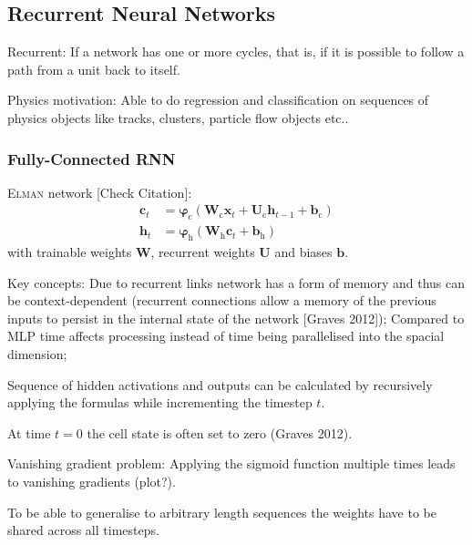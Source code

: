 \subsection{Recurrent Neural Networks}
\label{sec:rnn}

Recurrent: If a network has one or more cycles, that is, if it is possible to
follow a path from a unit back to itself.

Physics motivation: Able to do regression and classification on sequences of
physics objects like tracks, clusters, particle flow objects etc..

\subsubsection{Fully-Connected RNN}
\label{sec:fully_connected_rnn}


\textsc{Elman} network [Check Citation]\cite{elman, graves}:
\begin{align*}
  \mathbf{c}_t &= \bm{\varphi}_{\text{c}}\left( \mathbf{W}_{\text{c}} \mathbf{x}_{t} + \mathbf{U}_{\text{c}} \mathbf{h}_{t-1} + \mathbf{b}_{\text{c}} \right) \\
  \mathbf{h}_t &= \bm{\varphi}_{\text{h}}\left( \mathbf{W}_{\text{h}} \mathbf{c}_{t} + \mathbf{b}_{\text{h}} \right)
\end{align*}
 with
trainable weights $\mathbf{W}$, recurrent weights $\mathbf{U}$ and biases
$\mathbf{b}$.

Key concepts: Due to recurrent links network has a form of memory and thus can
be context-dependent (recurrent connections allow a memory of the previous
inputs to persist in the internal state of the network [Graves
2012]\cite{graves}); Compared to MLP time affects processing instead of time
being parallelised into the spacial dimension;

Sequence of hidden activations and outputs can be calculated by recursively
applying the formulas while incrementing the timestep $t$.

At time $t=0$ the cell state is often set to zero (Graves 2012).

Vanishing gradient problem: Applying the sigmoid function multiple times leads
to vanishing gradients (plot?).

To be able to generalise to arbitrary length sequences the weights have to be
shared across all timesteps.

